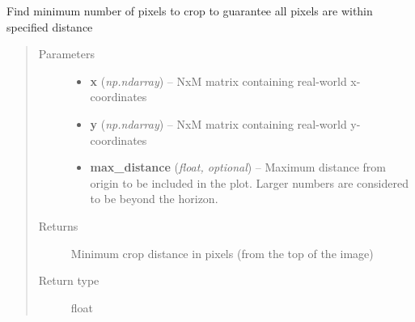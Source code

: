 \documentclass[letterpaper,10pt,english]{sphinxmanual}
\begin{document}
\begin{fulllineitems}
\label{rectification:flamingo.rectification.plot.find_horizon_offset}
Find minimum number of pixels to crop to guarantee all pixels are within specified distance
\begin{quote}\begin{description}
\item[{Parameters}] \leavevmode\begin{itemize}
\item {} 
\textbf{x} (\emph{np.ndarray}) -- NxM matrix containing real-world x-coordinates

\item {} 
\textbf{y} (\emph{np.ndarray}) -- NxM matrix containing real-world y-coordinates

\item {} 
\textbf{max\_distance} (\emph{float, optional}) -- Maximum distance from origin to be included in the plot.
Larger numbers are considered to be beyond the horizon.

\end{itemize}

\item[{Returns}] \leavevmode
Minimum crop distance in pixels (from the top of the image)

\item[{Return type}] \leavevmode
float

\end{description}\end{quote}

\end{fulllineitems}

\end{document}
